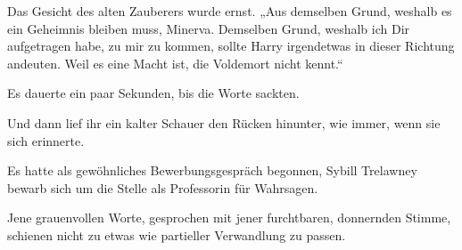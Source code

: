 Das Gesicht des alten Zauberers wurde ernst.
„Aus demselben Grund, weshalb es ein Geheimnis bleiben muss, Minerva. Demselben Grund, weshalb ich Dir aufgetragen habe, zu mir zu kommen, sollte Harry irgendetwas in dieser Richtung andeuten. Weil es eine Macht ist, die Voldemort nicht kennt.“

Es dauerte ein paar Sekunden, bis die Worte sackten.

Und dann lief ihr ein kalter Schauer den Rücken hinunter, wie immer, wenn sie sich erinnerte.

Es hatte als gewöhnliches Bewerbungsgespräch begonnen, Sybill Trelawney bewarb sich um die Stelle als Professorin für Wahrsagen.


Jene grauenvollen Worte, gesprochen mit jener furchtbaren, donnernden Stimme, schienen nicht zu etwas wie partieller Verwandlung zu passen.

